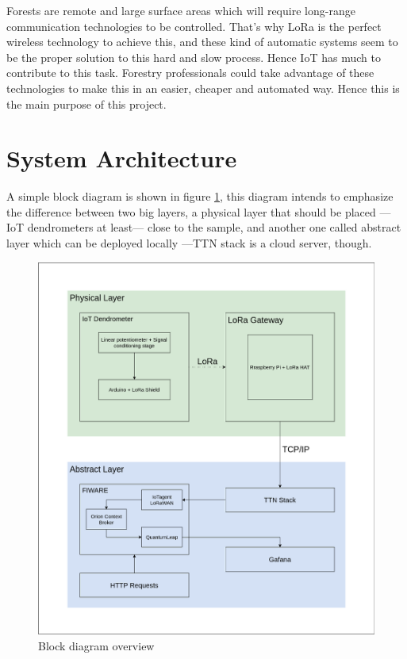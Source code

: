 \documentclass[11pt,a4paper,dvipsnames,twoside]{article}
\begin{document}
Forests are remote and large surface areas which will require long-range communication technologies to be controlled. That's why LoRa is the perfect wireless technology to achieve this, and these kind of automatic systems seem to be the proper solution to this hard and slow process. Hence IoT has much to contribute to this task. Forestry professionals could take advantage of these technologies to make this in an easier, cheaper and automated way. Hence this is the main purpose of this project.

\clearpage{\pagestyle{empty}\cleardoublepage}\thispagestyle{plain} %
\section{System Architecture}
A simple block diagram is shown in figure \ref{fig:block_diagram}, this diagram intends to emphasize the difference between two big layers, a physical layer that should be placed ---IoT dendrometers at least--- close to the sample, and another one called abstract layer which can be deployed locally ---TTN stack is a cloud server, though.

\begin{figure}[ht]
  \centering
  \includegraphics[width=.9\textwidth]{../schemes/simple_scheme_tbg.png}
  \caption{Block diagram overview}
  \label{fig:block_diagram}
\end{figure}
\end{document}
